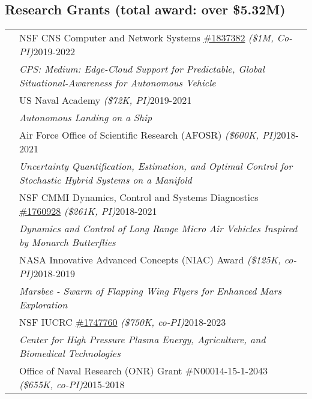 \documentclass[10pt]{article}
\begin{document}
\subsection*{Research Grants \textnormal{\normalsize (total award: over \$5.32M)}}
\setlength{\tabcolsep}{0cm}
\begin{tabularx}{\textwidth}{>{\setlength{\hsize}{0.5cm}}X X}%
& NSF CNS Computer and Network Systems \href{http://www.nsf.gov/awardsearch/showAward?AWD_ID=1837382}{\#1837382} \textit{(\$1M, Co-PI)}\hfill 2019-2022  \\
& \quad\textit{CPS: Medium: Edge-Cloud Support for Predictable, Global Situational-Awareness for Autonomous Vehicle} \vspace*{0.08cm}\\
%
& US Naval Academy \textit{(\$72K, PI)}\hfill 2019-2021  \\
& \quad\textit{Autonomous Landing on a Ship} \vspace*{0.08cm}\\
%
    & Air Force Office of Scientific Research (AFOSR)  \textit{(\$600K, PI)}\hfill 2018-2021  \\
& \quad\textit{Uncertainty Quantification, Estimation, and Optimal Control for Stochastic Hybrid Systems on a Manifold} \vspace*{0.08cm}\\
%
& NSF CMMI Dynamics, Control and Systems Diagnostics \href{http://www.nsf.gov/awardsearch/showAward?AWD_ID=1760927}{\#1760928} \textit{(\$261K, PI)}\hfill 2018-2021  \\
& \quad\textit{Dynamics and Control of Long Range Micro Air Vehicles Inspired by Monarch Butterflies} \vspace*{0.08cm}\\
%
& NASA Innovative Advanced Concepts (NIAC) Award \textit{(\$125K, co-PI)}\hfill 2018-2019 \\
& \quad\textit{Marsbee - Swarm of Flapping Wing Flyers for Enhanced Mars Exploration} \vspace*{0.08cm}\\
%
& NSF IUCRC \href{https://www.nsf.gov/awardsearch/showAward?AWD_ID=1747760}{\#1747760} \textit{(\$750K, co-PI)}\hfill 2018-2023 \\
& \quad\textit{Center for High Pressure Plasma Energy, Agriculture, and Biomedical Technologies} \vspace*{0.08cm}\\
%     
& Office of Naval Research (ONR) Grant \#N00014-15-1-2043 \textit{(\$655K, co-PI)}\hfill 2015-2018 \\

\end{tabularx}
\end{document}
